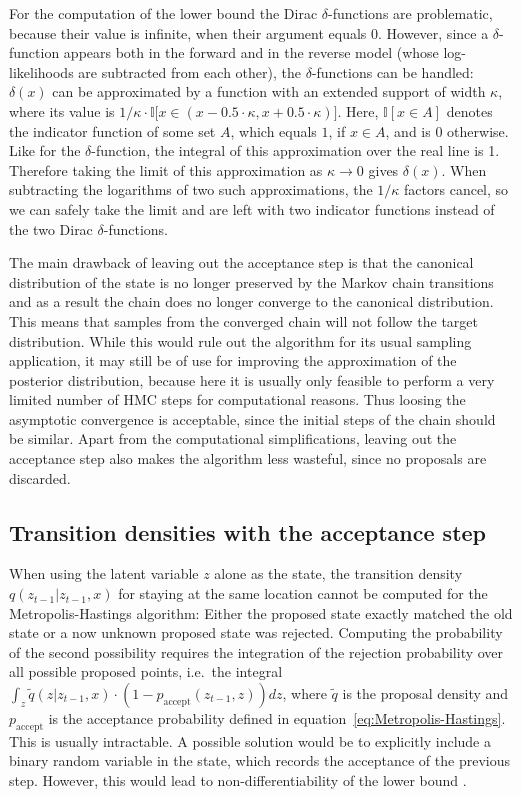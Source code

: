 For the computation of the lower bound the Dirac $\delta$-functions are problematic, because their value is infinite, when their argument equals $0$. However, since a $\delta$-function appears both in the forward and in the reverse model (whose log-likelihoods are subtracted from each other), the $\delta$-functions can be handled: $\delta(x)$ can be approximated by a function with an extended support of width $\kappa$, where its value is $1/\kappa \cdot \mathbb{I}\big[x \in (x - 0.5 \cdot \kappa, x + 0.5 \cdot \kappa)\big]$. Here, $\mathbb{I}[x \in A]$ denotes the indicator function of some set $A$, which equals $1$, if $x \in A$, and is $0$ otherwise. Like for the $\delta$-function, the integral of this approximation over the real line is 1. Therefore taking the limit of this approximation as $\kappa \rightarrow 0$ gives $\delta(x)$. When subtracting the logarithms of two such approximations, the $1/\kappa$ factors cancel, so we can safely take the limit and are left with two indicator functions instead of the two Dirac $\delta$-functions.

The main drawback of leaving out the acceptance step is that the canonical distribution of the state is no longer preserved by the Markov chain transitions and as a result the chain does no longer converge to the canonical distribution. This means that samples from the converged chain will not follow the target distribution. While this would rule out the algorithm for its usual sampling application, it may still be of use for improving the approximation of the posterior distribution, because here it is usually only feasible to perform a very limited number of HMC steps for computational reasons. Thus loosing the asymptotic convergence is acceptable, since the initial steps of the chain should be similar. Apart from the computational simplifications, leaving out the acceptance step also makes the algorithm less wasteful, since no proposals are discarded.

\subsection{Transition densities with the acceptance step}

When using the latent variable $z$ alone as the state, the transition density $q(z_{t-1}|z_{t-1},x)$ for staying at the same location cannot be computed for the Metropolis-Hastings algorithm: Either the proposed state exactly matched the old state or a now unknown proposed state was rejected. Computing the probability of the second possibility requires the integration of the rejection probability over all possible proposed points, i.e.\ the integral $\int_{z} \tilde{q}(z|z_{t-1}, x) \cdot (1 - p_{\textrm{accept}}(z_{t-1}, z)) dz$, where $\tilde{q}$ is the proposal density and $p_{\textrm{accept}}$ is the acceptance probability defined in equation~\eqref{eq:Metropolis-Hastings}. This is usually intractable. A possible solution would be to explicitly include a binary random variable in the state, which records the acceptance of the previous step. However, this would lead to non-differentiability of the lower bound \parencite{Salimans2014}.

